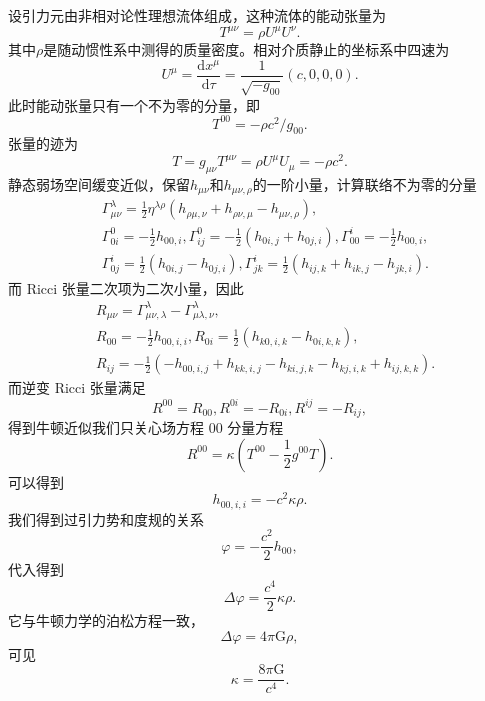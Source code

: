 \documentclass[11pt, a4paper, oneside, onecolumn]{ctexart}
\numberwithin{equation}{subsection}
\begin{document}
设引力元由非相对论性理想流体组成，这种流体的能动张量为
\begin{equation}
T^{\mu\nu}=\rho U^{\mu}U^{\nu}.
\end{equation}
其中$\rho$是随动惯性系中测得的质量密度。相对介质静止的坐标系中四速为
\begin{equation}
U^{\mu}=\frac{\mathrm{d}x^{\mu}}{\mathrm{d}\tau}=\frac{1}{\sqrt{-g_{00}}}\left(c,0,0,0\right).
\end{equation}
此时能动张量只有一个不为零的分量，即
\begin{equation}
T^{00}=-\rho c^{2}/g_{00}.
\end{equation}
张量的迹为
\begin{equation}
T=g_{\mu\nu}T^{\mu\nu}=\rho U^{\mu}U_{\mu}=-\rho c^{2}.
\end{equation}
静态弱场空间缓变近似，保留$h_{\mu\nu}$和$h_{\mu\nu,\rho}$的一阶小量，计算联络不为零的分量
\begin{align}
&\Gamma_{\mu\nu}^{\lambda}=\frac12\eta^{\lambda\rho}\left(h_{\rho\mu,\nu}+h_{\rho\nu,\mu}-h_{\mu\nu,\rho}\right),\\
&\Gamma_{0i}^{0}=-\frac12h_{00,i},\Gamma_{ij}^{0}=-\frac12\left(h_{0i,j}+h_{0j,i}\right),\Gamma_{00}^{i}=-\frac12h_{00,i},\\
&\Gamma_{0j}^{i}=\frac12\left(h_{0i,j}-h_{0j,i}\right),\Gamma_{jk}^{i}=\frac12\left(h_{ij,k}+h_{ik,j}-h_{jk,i}\right).
\end{align}
而 Ricci 张量二次项为二次小量，因此
\begin{align}
&R_{\mu\nu}=\Gamma_{\mu\nu,\lambda}^{\lambda}-\Gamma_{\mu\lambda,\nu}^{\lambda},\\
&R_{00}=-\frac12h_{00,i,i},R_{0i}=\frac12\left(h_{k0,i,k}-h_{0i,k,k}\right),\\
&R_{ij}=-\frac12\left(-h_{00,i,j}+h_{kk,i,j}-h_{ki,j,k}-h_{kj,i,k}+h_{ij,k,k}\right).
\end{align}
而逆变 Ricci 张量满足
\begin{equation}
R^{00}=R_{00},R^{0i}=-R_{0i},R^{ij}=-R_{ij},
\end{equation}
得到牛顿近似我们只关心场方程 00 分量方程
\begin{equation}
R^{00}=\kappa\left(T^{00}-\frac12g^{00}T\right).
\end{equation}
可以得到
\begin{equation}
h_{00,i,i}=-c^{2}\kappa\rho.
\end{equation}
我们得到过引力势和度规的关系
\begin{equation}
\varphi=-\frac{c^{2}}{2}h_{00},
\end{equation}
代入得到
\begin{equation}
\Delta{}\varphi=\frac{c^{4}}{2}\kappa\rho.
\end{equation}
它与牛顿力学的泊松方程一致，
\begin{equation}
\Delta{}\varphi=4\pi\mathrm{G}\rho,
\end{equation}
可见
\begin{equation}
\kappa=\frac{8\pi\mathrm{G}}{c^{4}}.
\end{equation}
\end{document}
